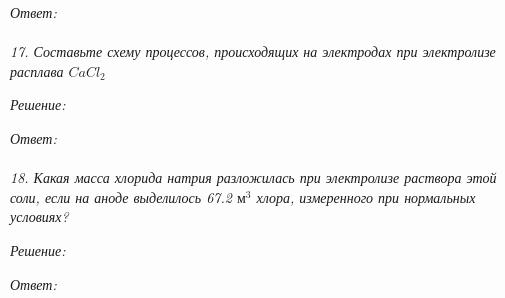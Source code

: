 \emph{Ответ: } \\\\


\emph{17. Составьте схему процессов, происходящих на электродах при 
электролизе расплава \( CaCl_2 \)}

\emph{Решение:}

\emph{Ответ: } \\\\


\emph{18. Какая масса хлорида натрия разложилась при электролизе раствора 
этой соли, если на аноде выделилось 67.2 \( \text{м}^3 \) хлора, 
измеренного при нормальных условиях?}

\emph{Решение:}

\emph{Ответ: } \\\\


